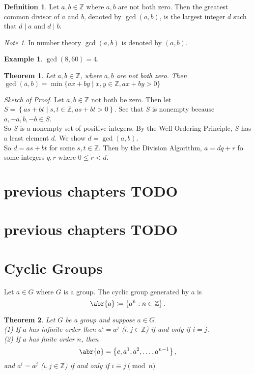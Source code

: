 \documentclass[11pt]{article}
\newcommand{\cbr}[1]{\left\{#1\right\}}
\newcommand{\divides}{\mid}
\newtheorem{theorem}{Theorem}[section]
\theoremstyle{remark}
\newtheorem*{note}{Note}
\theoremstyle{definition}
\newtheorem{definition}{Definition}[section]
\theoremstyle{remark}
\theoremstyle{definition}
\newtheorem*{example}{Example}
\theoremstyle{remark}
\begin{document}
\begin{definition}
  Let $a,b\in\mathbb{Z}$ where $a,b$ are not both zero. Then the greatest common divisor of $a$ and $b$, denoted by $\gcd(a,b)$, is the largest integer $d$ such that $d\divides a$ and $d\divides b$.

  \begin{note}
    In number theory $\gcd(a,b)$ is denoted by $(a,b)$.
  \end{note}
\end{definition}

\begin{example}
  $\gcd(8,60) = 4$.
\end{example}

\begin{theorem}
  Let $a,b\in\mathbb{Z}$, where $a,b$ are not both zero. Then $\gcd(a,b) = \min\{ax+by\mid x,y\in\mathbb{Z}, ax+by> 0\}$
\end{theorem}

\textit{Sketch of Proof.} Let $a,b\in\mathbb{Z}$ not both be zero. Then let $S = \cbr{as+bt\mid s,t\in\mathbb{Z}, as+bt>0}$. See that $S$ is nonempty because $a,-a,b,-b\in S$. \\
So $S$ is a nonempty set of positive integers. By the Well Ordering Principle, $S$ has a least element $d$. We show $d = \gcd(a,b)$. \\
So $d = as+bt$ for some $s,t\in\mathbb{Z}$. Then by the Division Algorithm, $a = dq+r$ fo some integers $q,r$ where $0\leq r < d$. \\




\section{previous chapters TODO}
\section{previous chapters TODO}

\newpage
\section{Cyclic Groups}

Let $a\in G$ where $G$ is a group. The cyclic group generated by $a$ is $$\abr{a} \coloneqq \cbr{a^n : n\in\mathbb{Z}}. $$

\begin{theorem}
    Let $G$ be a group and suppose $a\in G$. \\ (1) If $a$ has infinite order then $a^i = a^j$ ($i,j\in\mathbb{Z}$) if and only if $i=j$. \\ (2) If $a$ has finite order $n$, then $$\abr{a} = \cbr{e,a^1,a^2,\dots,a^{n-1}},$$ and $a^i = a^j$ ($i,j\in\mathbb{Z}$) if and only if $i \equiv j \pmod n$
\end{theorem}
\end{document}
